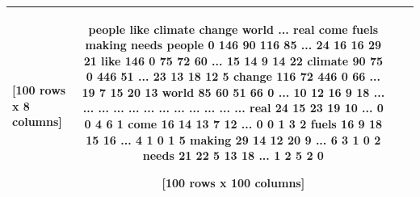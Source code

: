 \begin{table}
\begin{tabular}{lccc}
[100 rows x 8 columns] &          people  like  climate  change  world  ...  real  come  fuels  making  needs
people        0   146       90     116     85  ...    24    16     16      29     21
like        146     0       75      72     60  ...    15    14      9      14     22
climate      90    75        0     446     51  ...    23    13     18      12      5
change      116    72      446       0     66  ...    19     7     15      20     13
world        85    60       51      66      0  ...    10    12     16       9     18
...         ...   ...      ...     ...    ...  ...   ...   ...    ...     ...    ...
real         24    15       23      19     10  ...     0     0      4       6      1
come         16    14       13       7     12  ...     0     0      1       3      2
fuels        16     9       18      15     16  ...     4     1      0       1      5
making       29    14       12      20      9  ...     6     3      1       0      2
needs        21    22        5      13     18  ...     1     2      5       2      0

[100 rows x 100 columns] \\
\bottomrule
\end{tabular}
\end{table}
